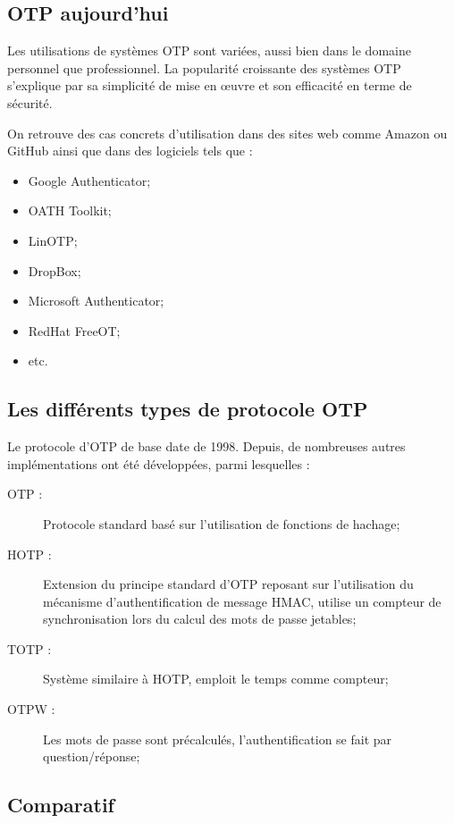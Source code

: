 \subsection{OTP aujourd'hui}

	Les utilisations de systèmes OTP sont variées, aussi bien dans le domaine
	personnel que professionnel. La popularité croissante des systèmes OTP
	s'explique par sa simplicité de mise en œuvre et son efficacité en terme
	de sécurité.

	On retrouve des cas concrets d'utilisation dans des sites web comme Amazon
	ou GitHub ainsi que dans des logiciels tels que :

	\begin{itemize}
		\item Google Authenticator;
		\item OATH Toolkit;
		\item LinOTP;
		\item DropBox;
		\item Microsoft	Authenticator;
		\item RedHat FreeOT;
		\item etc.
	\end{itemize}

\subsection{Les différents types de protocole OTP}

	Le protocole d'OTP de base date de 1998. Depuis, de nombreuses autres
	implémentations ont été développées, parmi lesquelles :

	\begin{description}
		\item[OTP :] Protocole standard basé sur l'utilisation de fonctions de
		hachage;
		\item[HOTP :] Extension du principe standard d'OTP reposant sur
		l'utilisation du mécanisme d'authentification de message HMAC, utilise
		un compteur de synchronisation lors du calcul des mots de passe
		jetables;
		\item[TOTP :] Système similaire à HOTP, emploit le temps comme
		compteur;
		\item[OTPW :] Les mots de passe sont précalculés, l'authentification
		se fait par question/réponse;
	\end{description}

\subsection{Comparatif}
